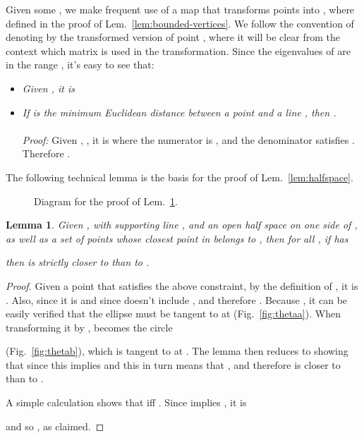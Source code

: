 \documentclass[11pt]{article}
\newtheorem{lemma}[theorem]{Lemma}
\begin{document}
Given some , we make frequent use of a map that transforms points
 into , where 
 defined in the
proof of Lem.~\ref{lem:bounded-vertices}. We follow the convention of denoting by  the transformed version of point
, where it will be clear from the context which matrix  is used in
the transformation. 
Since the eigenvalues of  are in the range , it's easy to
see that: \begin{itemize}
\item \emph{Given , it is }
\item \emph{If  is the minimum Euclidean distance between a point
 and a line , then .}\\ \\
\emph{Proof:} Given , , it is  where the numerator is , and the denominator satisfies 
. Therefore . 
\end{itemize}
The following technical lemma is 
the basis for the proof of Lem.~\ref{lem:halfspace}. 




\begin{figure}[ht]
\centering
{}
\label{fig:theta}
\caption{Diagram for the proof of Lem.~\ref{lem:tech}.}
\end{figure}


\begin{lemma}\label{lem:tech}
	Given , with supporting line , and 
an open half space  on one side of , 
as well as a set  of points whose closest point in 
belongs to , 
then 
for all , if  has

then  is strictly closer to  than to . 
\end{lemma}
\begin{proof}
Given a point  that satisfies the above constraint, 
by the definition of , 
it is . 
Also, since it is  and since  doesn't include , 
 and therefore .
Because , 
it can be easily verified that the ellipse  must be 
tangent to  at  (Fig.~\ref{fig:thetaa}). 
When transforming it by ,  becomes the circle

(Fig.~\ref{fig:thetab}), which is tangent to  at . 
The lemma then reduces to showing that  since this
implies  and this in turn means that , and therefore  is closer to  than to . 




A simple calculation shows that  iff 
. Since  implies , it is 

and so , as claimed. 	
\end{proof}
\end{document}
